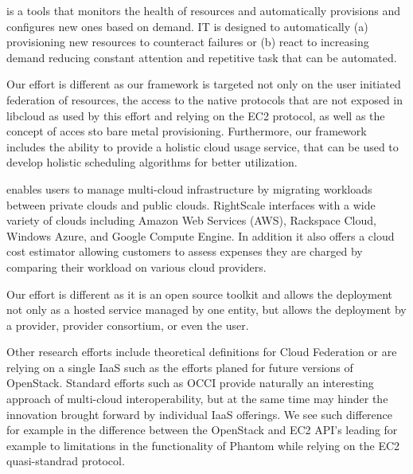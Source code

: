 \documentclass{tex/sig-alternate-2013}
\begin{document}
\begin{description}[leftmargin=0pt,itemsep=0pt,topsep=0pt]

\item[Phantom] \cite{phantom12,www-phantom} is a tools that monitors
  the health of resources and automatically provisions and configures
  new ones based on demand. IT is designed to automatically (a)
  provisioning new resources to counteract failures or (b) react to
  increasing demand reducing constant attention and repetitive task
  that can be automated.  

  Our effort is different as our framework is targeted not only on the
  user initiated federation of resources, the access to the native
  protocols that are not exposed in libcloud as used by this effort
  and relying on the EC2 protocol, as well as the concept of acces sto
  bare metal provisioning. Furthermore, our framework includes the
  ability to provide a holistic cloud usage service, that can be used
  to develop holistic scheduling algorithms for better utilization.

\item[RightScale] \cite{Rightscale} enables users to manage multi-cloud infrastructure by migrating workloads between private clouds and public clouds. RightScale interfaces with a wide variety of clouds including Amazon Web Services (AWS), Rackspace Cloud, Windows Azure, and Google Compute Engine. In addition it also offers a cloud cost estimator allowing customers to assess expenses they are charged by comparing their workload on various cloud providers.

Our effort is different as it is an open source toolkit and allows the deployment not only as a hosted service managed by one entity, but allows the deployment by a provider, provider consortium, or even the user. 


\end{description}

Other research efforts include theoretical definitions for Cloud Federation \cite{kurze2011cloudfederation} or are relying on a single IaaS such as the efforts planed for future versions of OpenStack. Standard efforts such as OCCI provide naturally an interesting approach of multi-cloud interoperability, but at the same time may hinder the innovation brought forward by individual IaaS offerings. We see such difference for example in the difference between the OpenStack and EC2 API's leading for example to limitations in the functionality of Phantom while relying on the EC2 quasi-standrad protocol.
\end{document}
